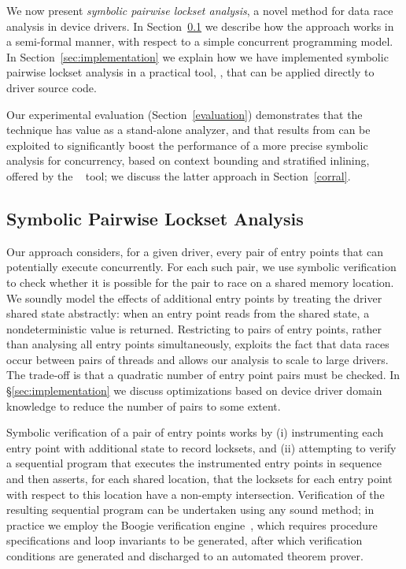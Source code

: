 
We now present \emph{symbolic pairwise lockset analysis}, a novel method for data race analysis in device drivers.  In Section~\ref{sec:symbolicpairwise} we describe how the approach works in a semi-formal manner, with respect to a simple concurrent programming model.  In Section~\ref{sec:implementation} we explain how we have implemented symbolic pairwise lockset analysis in a practical tool, \whoop, that can be applied directly to driver source code.

Our experimental evaluation (Section~\ref{evaluation}) demonstrates that the \whoop technique has value as a stand-alone analyzer, and that results from \whoop can be exploited to significantly boost the performance of a more precise symbolic analysis for concurrency, based on context bounding and stratified inlining, offered by the \corral~\cite{lal2012corral} tool; we discuss the latter approach in Section~\ref{corral}.

\subsection{Symbolic Pairwise Lockset Analysis}
\label{sec:symbolicpairwise}

Our approach considers, for a given driver, every pair of entry points that can potentially execute concurrently.  For each such pair, we use symbolic verification to check whether it is possible for the pair to race on a shared memory location. We soundly model the effects of additional entry points by treating the driver shared state abstractly: when an entry point reads from the shared state, a nondeterministic value is returned.  Restricting to pairs of entry points, rather than analysing all entry points simultaneously, exploits the fact that data races occur between pairs of threads and allows our analysis to scale to large drivers.  The trade-off is that a quadratic number of entry point pairs must be checked.  In \S\ref{sec:implementation} we discuss optimizations based on device driver domain knowledge to reduce the number of pairs to some extent.

Symbolic verification of a pair of entry points works by (i) instrumenting each entry point with additional state to record locksets, and (ii) attempting to verify a sequential program that executes the instrumented entry points in sequence and then asserts, for each shared location, that the locksets for each entry point with respect to this location have a non-empty intersection.  Verification of the resulting sequential program can be undertaken using any sound method; in practice we employ the Boogie verification engine~\cite{barnett2006boogie}, which requires procedure specifications and loop invariants to be generated, after which verification conditions are generated and discharged to an automated theorem prover.

